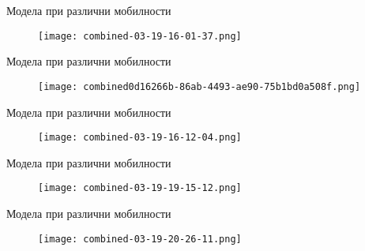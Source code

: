 \begin{frame}[t]{Модела при различни мобилности}
  \begin{figure}
    \centering
    \texttt{[image: combined-03-19-16-01-37.png]}
  \end{figure}
\end{frame}

\begin{frame}[t]{Модела при различни мобилности}
  \begin{figure}[h]
    \centering
    \texttt{[image: combined0d16266b-86ab-4493-ae90-75b1bd0a508f.png]}
  \end{figure}
\end{frame}

\begin{frame}[t]{Модела при различни мобилности}
  \begin{figure}
    \centering
    \texttt{[image: combined-03-19-16-12-04.png]}
  \end{figure}
\end{frame}

\begin{frame}[t]{Модела при различни мобилности}
  \begin{figure}
    \centering
    \texttt{[image: combined-03-19-19-15-12.png]}
  \end{figure}
\end{frame}

\begin{frame}[t]{Модела при различни мобилности}
  \begin{figure}
    \centering
    \texttt{[image: combined-03-19-20-26-11.png]}
  \end{figure}
\end{frame}
